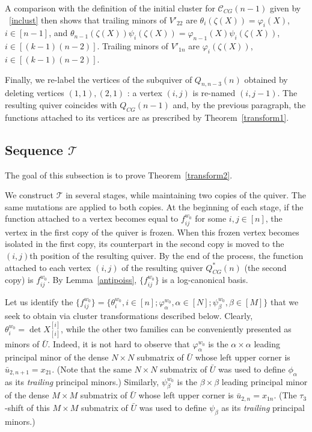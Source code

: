 \documentclass{amsart}
\theoremstyle{definition}
\theoremstyle{remark}
\numberwithin{equation}{section}
\numberwithin{theorem}{section}
\begin{document}
A comparison with the definition of the initial cluster for ${{\mathcal C}}_{CG}(n-1)$ given by 
~\eqref{inclust} then shows that trailing minors of $V'_{22}$ are
${{\theta}}_i(\zeta(X))={{\varphi}}_i(X)$, $i\in [n-1]$, and ${{\theta}}_{n-1}(\zeta(X))
{{\psi}}_i(\zeta(X))={{\varphi}}_{n-1}(X) {{\psi}}_i(\zeta(X))$,
$i\in [(k-1)(n-2)]$.
Trailing minors of $V'_{1n}$ are  ${{\varphi}}_i(\zeta(X))$,
$i\in [(k-1)(n-2)]$.

Finally, we re-label the vertices of the subquiver of  $Q_{n,n-3}(n)$ obtained by
deleting vertices $(1,1), (2,1)$ : a vertex $(i,j)$ is re-named $(i,j-1)$. The
resulting quiver coincides with $Q_{CG}(n-1)$ and, by the previous paragraph, the
functions attached to its vertices
are as prescribed by Theorem~\ref{transform1}.

 \subsection{Sequence ${{\mathcal T}}$}\label{Ttrans} 
 The goal of this subsection is to prove Theorem~\ref{transform2}.
 
We construct $\mathcal T$ in several stages, while maintaining two copies of the quiver. The same
mutations are applied to both copies. 
At the beginning of each stage, if the function attached to a vertex becomes equal to
$f^{w_0}_{ij}$ for some $i,j\in [n]$, the vertex in the first copy of the quiver is frozen. 
When this frozen vertex becomes isolated in the first copy, its counterpart in the second copy is moved 
to the $(i,j)$th position of the resulting quiver. By the end of the process, the function attached to 
each vertex $(i,j)$ of the resulting quiver $Q^*_{CG}(n)$ (the second copy) is $f^{w_0}_{ij}$.  
By Lemma~\ref{antipoiss}, $\{f^{w_0}_{ij}\}$ is a log-canonical basis. 

Let us identify the $\{f_{ij}^{w_0}\}=\{{{\theta}}^{w_0}_i, i\in[n];  {{\varphi}}^{w_0}_\alpha, \alpha\in [N]; {{\psi}}_\beta^{w_0}, \beta\in[M]\}$ that we seek to obtain via cluster transformations described below.
 Clearly, ${{\theta}}^{w_0}_i = \det X^{[i]}_{[i]}$, while the other two families can be conveniently presented as 
 minors of $\bar U$. Indeed, it is not hard to observe that ${{\varphi}}_\alpha^{w_0}$ is the $\alpha\times \alpha$ leading principal minor of the dense $N\times N$ submatrix
 of $\bar U$ whose left upper corner is $\bar u_{2,n+1} = x_{21}$. (Note that the same $N\times N$ submatrix of $\bar U$ was used to define $\phi_\alpha$
 as its {\em trailing\/} principal minors.) Similarly, ${{\psi}}_\beta^{w_0}$ is the $\beta\times \beta$ leading principal minor of the dense $M\times M$ submatrix
 of $\bar U$ whose left upper corner is $\bar u_{2,n} = x_{1n}$. (The $\tau_3$-shift of this $M\times M$ submatrix of $\bar U$ was used to define ${{\psi}}_\beta$ as its {\em trailing\/} principal minors.)  
\end{document}
